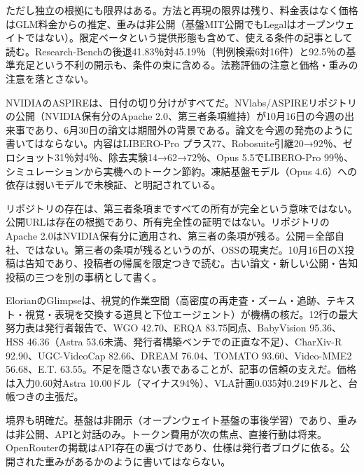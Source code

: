 \documentclass[lualatex,a4paper,10pt]{jlreq}
\begin{document}
ただし独立の根拠にも限界はある。方法と再現の限界は残り、料金表はなく価格はGLM料金からの推定、重みは非公開（基盤MIT公開でもLegalはオープンウェイトではない）。限定ベータという提供形態も含めて、使える条件の記事として読む。Research-Benchの後退41.83％対45.19％（判例検索6対16件）と92.5％の基準充足という不利の開示も、条件の束に含める。法務評価の注意と価格・重みの注意を落とさない。

NVIDIAのASPIREは、日付の切り分けがすべてだ。NVlabs/ASPIREリポジトリの公開（NVIDIA保有分のApache 2.0、第三者条項維持）が10月16日の今週の出来事であり、6月30日の論文は期間外の背景である。論文を今週の発売のように書いてはならない。内容はLIBERO-Pro プラス77、Robosuite引継20→92％、ゼロショット31％対4％、除去実験14→62→72％、Opus 5.5でLIBERO-Pro 99％、シミュレーションから実機へのトークン節約。凍結基盤モデル（Opus 4.6）への依存は弱いモデルで未検証、と明記されている。

リポジトリの存在は、第三者条項まですべての所有が完全という意味ではない。公開URLは存在の根拠であり、所有完全性の証明ではない。リポジトリのApache 2.0はNVIDIA保有分に適用され、第三者の条項が残る。公開＝全部自社、ではない。第三者の条項が残るというのが、OSSの現実だ。10月16日のX投稿は告知であり、投稿者の帰属を限定つきで読む。古い論文・新しい公開・告知投稿の三つを別の事柄として書く。

ElorianのGlimpseは、視覚的作業空間（高密度の再走査・ズーム・追跡、テキスト・視覚・表現を交換する道具と下位エージェント）が機構の核だ。12行の最大努力表は発行者報告で、WGO 42.70、ERQA 83.75同点、BabyVision 95.36、HSS 46.36（Astra 53.6未満、発行者構築ベンチでの正直な不足）、CharXiv-R 92.90、UGC-VideoCap 82.66、DREAM 76.04、TOMATO 93.60、Video-MME2 56.68、E.T. 63.55。不足を隠さない表であることが、記事の信頼の支えだ。価格は入力0.60対Astra 10.00ドル（マイナス94％）、VLA計画0.035対0.249ドルと、台帳つきの主張だ。

境界も明確だ。基盤は非開示（オープンウェイト基盤の事後学習）であり、重みは非公開、APIと対話のみ。トークン費用が次の焦点、直接行動は将来。OpenRouterの掲載はAPI存在の裏づけであり、仕様は発行者ブログに依る。公開された重みがあるかのように書いてはならない。
\end{document}
